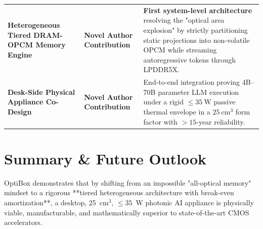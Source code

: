 \documentclass[11pt,a4paper]{report}
\begin{document}
\begin{table}[htbp]
\begin{tabular}{p{3.2cm}p{4.2cm}p{6.8cm}}
\addlinespace
\textbf{Heterogeneous Tiered DRAM-OPCM Memory Engine} & \textbf{Novel Author Contribution} & \textbf{First system-level architecture} resolving the "optical area explosion" by strictly partitioning static projections into non-volatile OPCM while streaming autoregressive tokens through LPDDR5X. \\
\addlinespace
\textbf{Desk-Side Physical Appliance Co-Design} & \textbf{Novel Author Contribution} & End-to-end integration proving 4B--70B parameter LLM execution under a rigid $\le 35\ \text{W}$ passive thermal envelope in a $25\ \text{cm}^3$ form factor with $>15$-year reliability. \\
\bottomrule
\end{tabular}
\end{table}

\section{Summary \& Future Outlook}
OptiBox demonstrates that by shifting from an impossible "all-optical memory" mindset to a rigorous **tiered heterogeneous architecture with break-even amortization**, a desktop, 25~cm$^3$, $\le 35$~W photonic AI appliance is physically viable, manufacturable, and mathematically superior to state-of-the-art CMOS accelerators.
\end{document}
